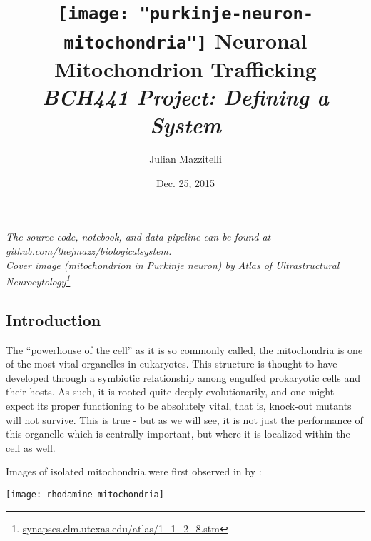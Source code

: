 \title{
\vspace{-155pt}
\hspace*{-80pt}\texttt{[image: "purkinje-neuron-mitochondria"]}
Neuronal Mitochondrion Trafficking \\
\small{\textit{BCH441 Project: Defining a System}}
}
\author{Julian Mazzitelli}
\date{Dec. 25, 2015}

\maketitle

\begin{center}
\textit{
The source code, notebook, and data pipeline can be found at
\href{https://github.com/thejmazz/biologicalsystem}{github.com/thejmazz/biologicalsystem}. \\
Cover image (mitochondrion in Purkinje neuron) by Atlas of Ultrastructural Neurocytology\footnote{\href{http://synapses.clm.utexas.edu/atlas/1_1_2_8.stm}{synapses.clm.utexas.edu/atlas/1\_1\_2\_8.stm}}
}
\end{center}

\tableofcontents

\begin{bottompar}
\section{Introduction}

The ``powerhouse of the cell'' as it is so commonly called, the mitochondria is
one of the most vital organelles in eukaryotes. This structure is thought to
have developed through a symbiotic relationship among engulfed prokaryotic cells
and their hosts. As such, it is rooted quite deeply evolutionarily, and one
might expect its proper functioning to be absolutely vital, that is, knock-out
mutants will not survive. This is true - but as we will see, it is not just the
performance of this organelle which is centrally important, but where it is
localized within the cell as well.

\end{bottompar}

Images of isolated mitochondria were first observed in \citeyear{Lincoln1979}
by \citeauthor{Lincoln1979}:

\begin{center}
  \texttt{[image: rhodamine-mitochondria]}
\end{center}

